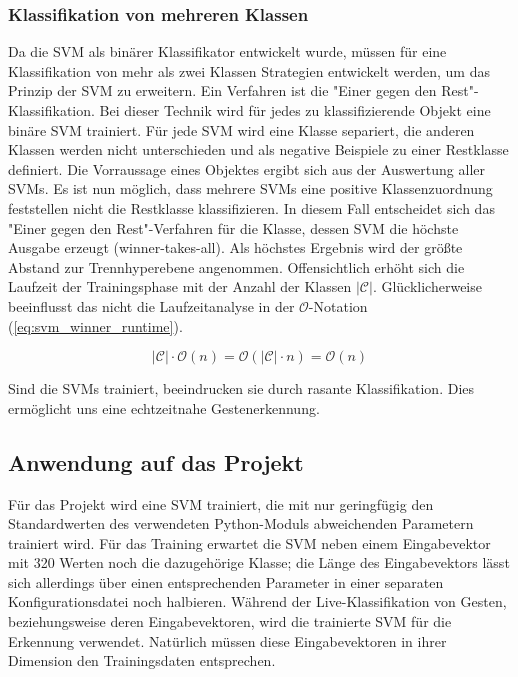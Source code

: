 \newpage

\subsubsection{Klassifikation von mehreren Klassen}

Da die \ac{SVM} als binärer Klassifikator entwickelt wurde, müssen für eine Klassifikation von mehr als zwei Klassen Strategien entwickelt werden, um das Prinzip der \ac{SVM} zu erweitern. 
Ein Verfahren ist die "{}Einer gegen den Rest"{}-Klassifikation. 
Bei dieser Technik wird für jedes zu klassifizierende Objekt eine binäre \ac{SVM} trainiert. 
Für jede \ac{SVM} wird eine Klasse separiert, die anderen Klassen werden nicht unterschieden und als negative Beispiele zu einer Restklasse definiert. 
Die Vorraussage eines Objektes ergibt sich aus der Auswertung aller \ac{SVMs}. 
Es ist nun möglich, dass mehrere \ac{SVMs} eine positive Klassenzuordnung feststellen nicht die Restklasse klassifizieren. 
In diesem Fall entscheidet sich das "{}Einer gegen den Rest"{}-Verfahren für die Klasse, dessen \ac{SVM} die höchste Ausgabe erzeugt (winner-takes-all). 
Als höchstes Ergebnis wird der größte Abstand zur Trennhyperebene angenommen. 
Offensichtlich erhöht sich die Laufzeit der Trainingsphase mit der Anzahl der Klassen $|\mathcal{C}|$. 
Glücklicherweise beeinflusst das nicht die Laufzeitanalyse in der $\mathcal{O}$-Notation (\ref{eq:svm_winner_runtime}). 

\begin{equation}
\label{eq:svm_winner_runtime}
    |\mathcal{C}| \cdot \mathcal{O}(n) = \mathcal{O}(|\mathcal{C}| \cdot n) =  \mathcal{O}(n)
\end{equation}

Sind die SVMs trainiert, beeindrucken sie durch rasante Klassifikation. 
Dies ermöglicht uns eine echtzeitnahe Gestenerkennung.



\newpage 
\subsection{Anwendung auf das Projekt}
Für das Projekt wird eine \ac{SVM} trainiert, die mit nur geringfügig den Standardwerten des verwendeten Python-Moduls abweichenden Parametern trainiert wird. 
Für das Training erwartet die \ac{SVM} neben einem Eingabevektor mit 320 Werten noch die dazugehörige Klasse; die Länge des Eingabevektors lässt sich allerdings über einen entsprechenden Parameter in einer separaten Konfigurationsdatei noch halbieren.
Während der Live-Klassifikation von Gesten, beziehungsweise deren Eingabevektoren, wird die trainierte \ac{SVM} für die Erkennung verwendet.
Natürlich müssen diese Eingabevektoren in ihrer Dimension den Trainingsdaten entsprechen.

